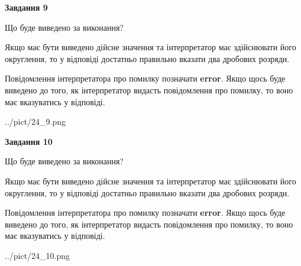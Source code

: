 \documentclass[12pt, ukrainian]{article}
\begin{document}
{\begin {Large}
{\begin {center}\textbf{Завдання 9}\end {center}}\par
Що буде виведено за виконання? \par

Якщо має бути виведено дійсне значення та інтерпретатор має здійснювати його округлення, 
то у відповіді достатньо правильно вказати два дробових розряди.

Повідомлення інтерпретатора про помилку позначати \textbf{error}.
Якщо щось буде виведено до того, як інтерпретатор видасть повідомлення про помилку, 
то воно має вказуватись у відповіді. \par

\begin{center}
	{../pict/24_9.png}
\end{center}
\newpage

{\begin {center}\textbf{Завдання 10}\end {center}}\par
Що буде виведено за виконання? \par

Якщо має бути виведено дійсне значення та інтерпретатор має здійснювати його округлення, 
то у відповіді достатньо правильно вказати два дробових розряди.

Повідомлення інтерпретатора про помилку позначати \textbf{error}.
Якщо щось буде виведено до того, як інтерпретатор видасть повідомлення про помилку, 
то воно має вказуватись у відповіді. \par

\begin{center}
	{../pict/24_10.png}
\end{center}
\newpage

\end {Large}}
\end{document}
